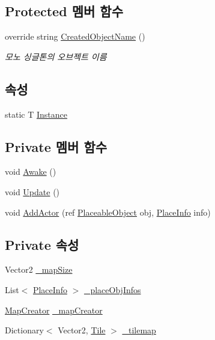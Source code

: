 \subsection*{Protected 멤버 함수}
\begin{DoxyCompactItemize}
\item 
override string \hyperlink{class_map_manager_aa3459a9fe2d748c6e9f2c3da8a6273cd}{Created\+Object\+Name} ()
\begin{DoxyCompactList}\small\item\em 모노 싱글톤의 오브젝트 이름 \end{DoxyCompactList}\end{DoxyCompactItemize}
\subsection*{속성}
\begin{DoxyCompactItemize}
\item 
static T \hyperlink{class_m_c_n_1_1_mono_singletone_aa50c027cca64cf4ad30c1ee5c83e0b78}{Instance}
\end{DoxyCompactItemize}
\subsection*{Private 멤버 함수}
\begin{DoxyCompactItemize}
\item 
void \hyperlink{class_map_manager_ad633984007048c7d63eab44aaeb0c32d}{Awake} ()
\item 
void \hyperlink{class_map_manager_aeaf61c0a498d98a5ac778db479353d77}{Update} ()
\item 
void \hyperlink{class_map_manager_a3fd471f20bdfc00d53997d782bc3339a}{Add\+Actor} (ref \hyperlink{class_placeable_object}{Placeable\+Object} obj, \hyperlink{class_m_c_n_1_1_place_info}{Place\+Info} info)
\end{DoxyCompactItemize}
\subsection*{Private 속성}
\begin{DoxyCompactItemize}
\item 
Vector2 \hyperlink{class_map_manager_a960f398cc92f569f620ddc8c0140a5c7}{\+\_\+map\+Size}
\item 
List$<$ \hyperlink{class_m_c_n_1_1_place_info}{Place\+Info} $>$ \hyperlink{class_map_manager_ab581d2c754246f74999a0b744ba2b14f}{\+\_\+place\+Obj\+Infos}
\item 
\hyperlink{class_map_creator}{Map\+Creator} \hyperlink{class_map_manager_aa837a852f355a33b263c1bb07c6c4ece}{\+\_\+map\+Creator}
\item 
Dictionary$<$ Vector2, \hyperlink{class_tile}{Tile} $>$ \hyperlink{class_map_manager_a58f7635d8e19795f3845a3f85e2b4ac3}{\+\_\+tilemap}
\end{DoxyCompactItemize}


